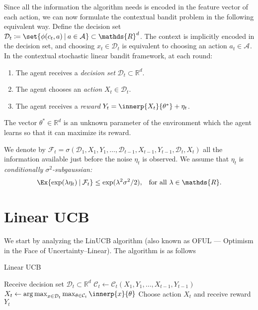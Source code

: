 \documentclass{article}
\newcommand{\defeq}{\coloneq}
\newcommand{\Real}{\mathds{R}}
\DeclareMathOperator*{\argmax}{arg\,max}
\newcommand\given[1][\delimsize]{%
  \providecommand{\delimsize}{}
  \nonscript\:#1\vert\allowbreak\nonscript\:\mathopen{}
}
\newcommand{\Aset}[1]{\mathcal{A}_{#1}}
\newcommand{\Dset}[1]{\mathcal{D}_{#1}}
\newcommand{\Cset}[1]{\mathcal{C}_{#1}}
\begin{document}
Since all the information the algorithm needs is encoded in the
feature vector of each action, we can now formulate the contextual
bandit problem in the following equivalent way.  Define the decision
set
$\Dset{t} \defeq \set{\phi(c_t,a)\given a\in\Aset{}} \subset \Real^d$.
The context is implicitly encoded in the decision set, and choosing
$x_t\in\Dset{t}$ is equivalent to choosing an action $a_t\in\Aset{}$.
In the contextual stochastic linear bandit framework, at each round:
\begin{enumerate}
\item The agent receives a \emph{decision set} $\mathcal{D}_t \subset
  \Real^d$.
\item The agent chooses an \emph{action} $X_t \in \mathcal{D}_t$.
\item The agent receives a \emph{reward} $Y_t = \innerp{X_t}{\theta^*} + \eta_t$.
\end{enumerate}
The vector $\theta^*\in\Real^d$ is an unknown parameter of the
environment which the agent learns so that it can maximize its reward.

\begin{assumption}\label{assumption:subgaussian-noise}
  We denote by
  $\mathcal{F}_t =
  \sigma(\mathcal{D}_1,X_1,Y_1,\dotsc,\mathcal{D}_{t-1},X_{t-1},Y_{t-1},\mathcal{D}_t,X_t)$
  all the information available just before the noise $\eta_t$ is
  observed.  We assume that $\eta_t$ is \emph{conditionally
    $\sigma^2$-subgaussian:}
  \begin{align*}
    \Ex{\exp(\lambda\eta_t)\given \mathcal{F}_t} &\le \exp(\lambda^2\sigma^2/2),
    &\text{for all } \lambda\in\Real.
  \end{align*}
\end{assumption}


\section{Linear UCB}

We start by analyzing the LinUCB algorithm (also known as OFUL ---
Optimism in the Face of Uncertainty--Linear).  The algorithm is as follows

\begin{algorithm}
  \caption{Linear UCB}\label{alg:linucb}
  \begin{algorithmic}
    \State Receive decision set $\Dset{t} \subset \Real^d$
    \State $\Cset{t} \gets \Cset{t}(X_1,Y_1,\dotsc,X_{t-1},Y_{t-1})$
    \State $X_t \gets \argmax_{x\in\Dset{t}}
    \max_{\theta\in\Cset{t}} \innerp{x}{\theta}$
    \State Choose action $X_t$ and receive reward $Y_t$
    \EndFor
  \end{algorithmic}
\end{algorithm}
\end{document}
